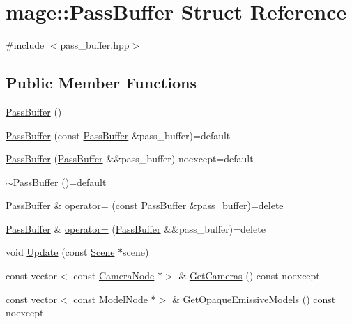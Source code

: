 \hypertarget{structmage_1_1_pass_buffer}{}\section{mage\+:\+:Pass\+Buffer Struct Reference}
\label{structmage_1_1_pass_buffer}


{\ttfamily \#include $<$pass\+\_\+buffer.\+hpp$>$}

\subsection*{Public Member Functions}
\begin{DoxyCompactItemize}
\item 
\hyperlink{structmage_1_1_pass_buffer_a02e07a26327f6e57b193521636bb8e10}{Pass\+Buffer} ()
\item 
\hyperlink{structmage_1_1_pass_buffer_a1c6e779725227ebbb8e3d15a4515edbc}{Pass\+Buffer} (const \hyperlink{structmage_1_1_pass_buffer}{Pass\+Buffer} \&pass\+\_\+buffer)=default
\item 
\hyperlink{structmage_1_1_pass_buffer_a2aee0227f8dab61b98f84d5024d2a06a}{Pass\+Buffer} (\hyperlink{structmage_1_1_pass_buffer}{Pass\+Buffer} \&\&pass\+\_\+buffer) noexcept=default
\item 
\hyperlink{structmage_1_1_pass_buffer_a650dec579522b7d5c5810a535b10773a}{$\sim$\+Pass\+Buffer} ()=default
\item 
\hyperlink{structmage_1_1_pass_buffer}{Pass\+Buffer} \& \hyperlink{structmage_1_1_pass_buffer_a8d0cc48dea7dfb6b710b6162b3a82b7e}{operator=} (const \hyperlink{structmage_1_1_pass_buffer}{Pass\+Buffer} \&pass\+\_\+buffer)=delete
\item 
\hyperlink{structmage_1_1_pass_buffer}{Pass\+Buffer} \& \hyperlink{structmage_1_1_pass_buffer_a8a5832066c415bea077107c7a9d18df5}{operator=} (\hyperlink{structmage_1_1_pass_buffer}{Pass\+Buffer} \&\&pass\+\_\+buffer)=delete
\item 
void \hyperlink{structmage_1_1_pass_buffer_a6b73eb28fac15b121ff013b03ab643f8}{Update} (const \hyperlink{classmage_1_1_scene}{Scene} $\ast$scene)
\item 
const vector$<$ const \hyperlink{classmage_1_1_camera_node}{Camera\+Node} $\ast$$>$ \& \hyperlink{structmage_1_1_pass_buffer_a1b3745dab0028b470c76c695e55f6466}{Get\+Cameras} () const noexcept
\item 
const vector$<$ const \hyperlink{classmage_1_1_model_node}{Model\+Node} $\ast$$>$ \& \hyperlink{structmage_1_1_pass_buffer_a1fcbb01cc67df0152046ceb2c9133b9a}{Get\+Opaque\+Emissive\+Models} () const noexcept

\end{DoxyCompactItemize}
